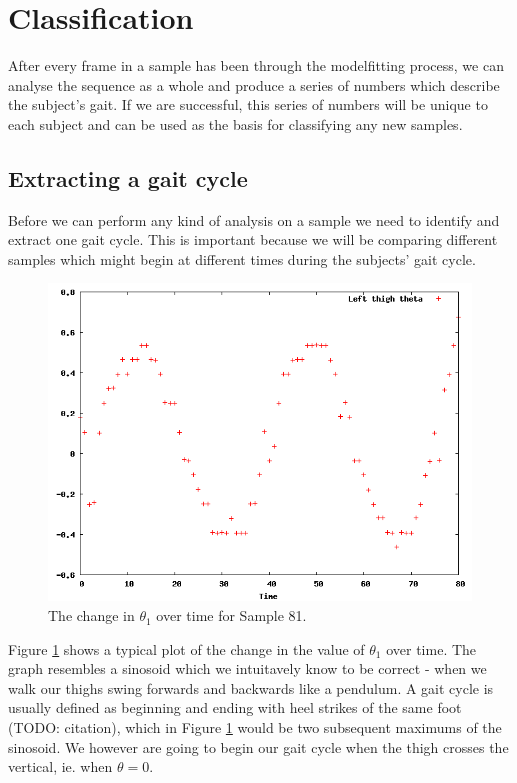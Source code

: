 \section{Classification}

After every frame in a sample has been through the modelfitting process, we can analyse the sequence as a whole
and produce a series of numbers which describe the subject's gait.
If we are successful, this series of numbers will be unique to each subject and can be used as the basis for classifying any new samples.


\subsection{Extracting a gait cycle}
\label{ExtractingGaitCycle}

Before we can perform any kind of analysis on a sample we need to identify and extract one gait cycle.
This is important because we will be comparing different samples which might begin at different times during the subjects' gait cycle.

\begin{figure}[tb]
	\centering
	\includegraphics[width=\textwidth]{curvefitting.png}
	\caption{The change in $\theta_1$ over time for Sample 81.}
	\label{CurveFitting1}
\end{figure}

Figure \ref{CurveFitting1} shows a typical plot of the change in the value of $\theta_1$ over time.
The graph resembles a sinosoid which we intuitavely know to be correct - when we walk our thighs swing forwards and backwards like a pendulum.
A gait cycle is usually defined as beginning and ending with heel strikes of the same foot (TODO: citation), which in Figure \ref{CurveFitting1} would be two subsequent maximums of the sinosoid.
We however are going to begin our gait cycle when the thigh crosses the vertical, ie. when $\theta = 0$.

